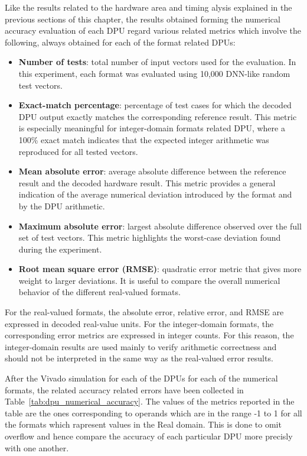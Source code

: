 Like the results related to the hardware area and timing alysis explained in the previous sections of this chapter, the results obtained forming the numerical accuracy evaluation of each DPU regard various related metrics which involve the following, always obtained for each of the format related DPUs: 
\begin{itemize}
    \item \textbf{Number of tests}: total number of input vectors used for the
    evaluation. In this experiment, each format was evaluated using 10,000 DNN-like random test vectors.

    \item \textbf{Exact-match percentage}: percentage of test cases for which
    the decoded DPU output exactly matches the corresponding reference result. This metric is especially meaningful for integer-domain formats related DPU, where a 100\% exact match indicates that the expected integer arithmetic was reproduced for all tested vectors.

    \item \textbf{Mean absolute error}: average absolute difference between
    the reference result and the decoded hardware result. This metric provides a general indication of the average numerical deviation introduced by the format and by the DPU arithmetic.

    \item \textbf{Maximum absolute error}: largest absolute difference observed over the full set of test vectors. This metric highlights the worst-case deviation found during the experiment.

    \item \textbf{Root mean square error (RMSE)}: quadratic error metric that gives
    more weight to larger deviations. It is useful to compare the overall numerical behavior of the different real-valued formats.

\end{itemize}

For the real-valued formats, the absolute error, relative error, and RMSE are expressed in decoded real-value units. For the integer-domain formats, the corresponding error metrics are expressed in integer counts. For this reason, the integer-domain results are used mainly to verify arithmetic correctness and should not be interpreted in the same way as the real-valued error results.

After the Vivado simulation for each of the DPUs for each of the numerical formats, the related accuracy related errors have been collected in Table~\ref{tab:dpu_numerical_accuracy}. The values of the metrics reported in the table are the ones corresponding to operands which are in the range -1 to 1 for all the formats which rapresent values in the Real domain. This is done to omit overflow and hence compare the accuracy of each particular DPU more precisly with one another.

